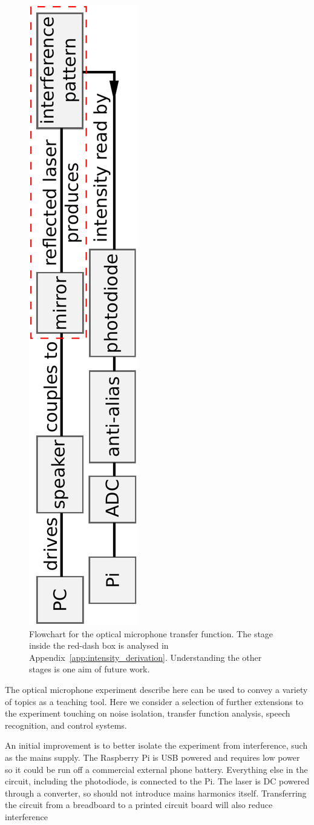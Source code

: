 \documentclass[paper-main.tex]{subfiles}
\begin{document}
\begin{figure}
	\includegraphics[height=.99\textwidth, angle=-90]{figures/pipeline.pdf}
	\caption{
Flowchart for the optical microphone transfer function. 
The stage inside the red-dash box is analysed in Appendix~\ref{app:intensity_derivation}. Understanding the other stages is one aim of future work. 
}
	\label{fig:pipeline_highlighted}
\end{figure}


The optical microphone experiment describe here can be used to convey a variety of topics as a teaching tool. 
Here we consider a selection of further extensions to the experiment touching on noise isolation, transfer function analysis, speech recognition, and control systems. 


An initial improvement is to better isolate the experiment from interference, such as the mains supply. 
The Raspberry Pi is USB powered and requires low power so it could be run off a commercial external phone battery. 
Everything else in the circuit, including the photodiode, is connected to the Pi. 
The laser is DC powered through a converter, so should not introduce mains harmonics itself. 
Transferring the circuit from a breadboard to a printed circuit board will also reduce interference~\cite{elfekey2013design}

\end{document}
